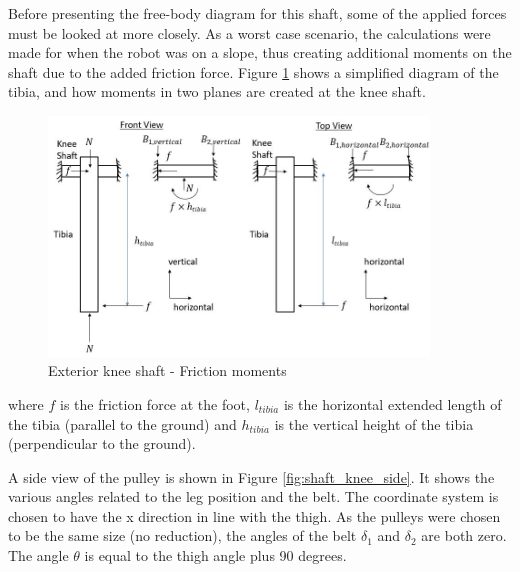 
Before presenting the free-body diagram for this shaft, some of the applied forces must be looked at more closely. As a worst case scenario, the calculations were made for when the robot was on a slope, thus creating additional moments on the shaft due to the added friction force. Figure \ref{fig:shaft_knee_friction} shows a simplified diagram of the tibia, and how moments in two planes are created at the knee shaft.

\begin{figure}
    \centering
    \includegraphics[width=0.9\textwidth]{4_Analysis/img/Shafts/ShaftKneeFriction.JPG}
    \caption{Exterior knee shaft - Friction moments}
    \label{fig:shaft_knee_friction}
\end{figure}

where $f$ is the friction force at the foot, $l_{tibia}$ is the horizontal extended length of the tibia (parallel to the ground) and $h_{tibia}$ is the vertical height of the tibia (perpendicular to the ground).

A side view of the pulley is shown in Figure
\ref{fig:shaft_knee_side}. It shows the various angles related to the leg position and the belt. The coordinate system is chosen to have the x direction in line with the thigh. As the pulleys were chosen to be the same size (no reduction), the angles of the belt $\delta_1$ and $\delta_2$ are both zero. The angle $\theta$ is equal to the thigh angle plus 90 degrees. 

